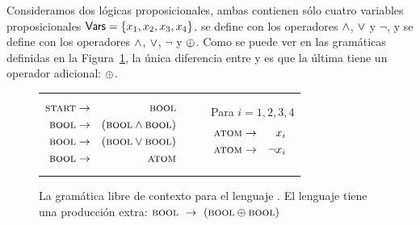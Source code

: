 
Consideramos dos lógicas proposicionales, ambas contienen sólo cuatro variables proposicionales  ${\sf Vars}=\{x_1, x_2, x_3, x_4\}$. \grambool se define con los operadores $\wedge$, $\vee$ y $\lnot$, y \gramboolxor se define con los operadores $\wedge$, $\vee$, $\lnot$ y $\oplus$. Como se puede ver en las gramáticas definidas en la Figura~\ref{PCFG}, la única diferencia entre \grambool y \gramboolxor es que la última tiene un operador adicional: $\oplus$.  
 \begin{figure}[h!]
\centering
\small\vspace{-.3cm}
\begin{tabular}{ccc}
\begin{minipage}[h]{0,2\textwidth}
\begin{eqnarray*}
\textsc{start} &\to&\textsc{bool}\\
\textsc{bool} &\to&(\textsc{bool} \wedge \textsc{bool}) \\
\textsc{bool} &\to&(\textsc{bool} \vee \textsc{bool}) \\
\textsc{bool} &\to&\textsc{atom}
\end{eqnarray*}
\end{minipage}
&
\ \quad
&
\begin{minipage}[h]{0,2\textwidth}
\ \quad Para $i=1,2,3,4$
\begin{eqnarray*}
\textsc{atom} &\to& x_i \\
\textsc{atom} &\to&\lnot x_i 
\end{eqnarray*}
\end{minipage}
\end{tabular}
      \caption{La gramática libre de contexto para el lenguaje \grambool.  El lenguaje \gramboolxor tiene una producción extra: $\textsc{bool}\  \to\ (\textsc{bool} \oplus \textsc{bool})$}
      \label{PCFG}
   \end{figure}



